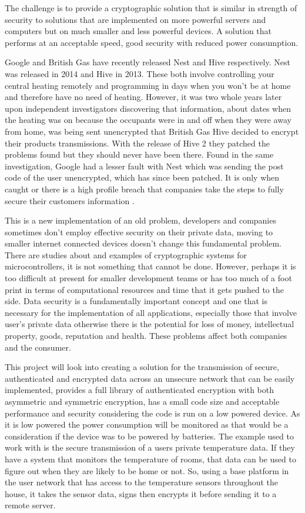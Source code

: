 	The challenge is to provide a cryptographic solution that is similar in strength of security to solutions that are implemented on more powerful servers and computers but on much smaller and less powerful devices. A solution that performs at an acceptable speed, good security with reduced power consumption.
	
	Google and British Gas have recently released Nest and Hive respectively. Nest was released in 2014 and Hive in 2013. These both involve controlling your central heating remotely and programming in days when you won't be at home and therefore have no need of heating. However, it was two whole years later upon independent investigators discovering that information, about dates when the heating was on because the occupants were in and off when they were away from home, was being sent unencrypted that British Gas Hive decided to encrypt their products transmissions. With the release of Hive 2 they patched the problems found but they should never have been there. Found in the same investigation, Google had a lesser fault with Nest which was sending the post code of the user unencrypted, which has since been patched. It is only when caught or there is a high profile breach that companies take the steps to fully secure their customers information \cite{which}. 
	
	This is a new implementation of an old problem, developers and companies sometimes don't employ effective security on their private data, moving to smaller internet connected devices doesn't change this fundamental problem. There are studies about and examples of cryptographic systems for microcontrollers, it is not something that cannot be done. However, perhaps it is too difficult at present for smaller development teams or has too much of a foot print in terms of computational resources and time that it gets pushed to the side. Data security is a fundamentally important concept and one that is necessary for the implementation of all applications, especially those that involve user's private data otherwise there is the potential for loss of money, intellectual property, goods, reputation and health. These problems affect both companies and the consumer.
	
	This project will look into creating a solution for the transmission of secure, authenticated and encrypted data across an unsecure network that can be easily implemented, provides a full library of authenticated encryption with both asymmetric and symmetric encryption, has a small code size and acceptable performance and security considering the code is run on a low powered device. As it is low powered the power consumption will be monitored as that would be a consideration if the device was to be powered by batteries. The example used to work with is the secure transmission of a users private temperature data. If they have a system that monitors the temperature of rooms, that data can be used to figure out when they are likely to be home or not. So, using a base platform in the user network that has access to the temperature sensors throughout the house, it takes the sensor data, signs then encrypts it before sending it to a remote server. 
	
	
	